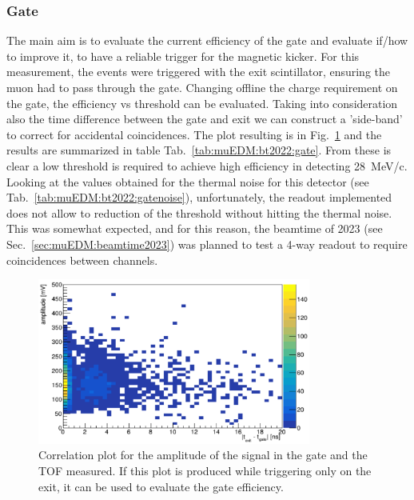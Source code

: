 \begin{refsection}
        \subsubsection{Gate}
            The main aim is to evaluate the current efficiency of the gate and evaluate if/how to improve it, to have a reliable trigger for the magnetic kicker.
            For this measurement, the events were triggered with the exit scintillator, ensuring the muon had to pass through the gate.
            Changing offline the charge requirement on the gate, the efficiency vs threshold can be evaluated.
            Taking into consideration also the time difference between the gate and exit we can construct a 'side-band' to correct for accidental coincidences.
            The plot resulting is in Fig.~\ref{fig:muEDM:bt20212gate} and the results are summarized in table Tab.~\ref{tab:muEDM:bt2022:gate}.
            From these is clear a low threshold is required to achieve high efficiency in detecting \SI{28}{MeV/c}.
            Looking at the values obtained for the thermal noise for this detector (see Tab.~\ref{tab:muEDM:bt2022:gatenoise}), unfortunately, the readout implemented does not allow to reduction of the threshold without hitting the thermal noise.
            This was somewhat expected, and for this reason, the beamtime of 2023 (see Sec.~\ref{sec:muEDM:beamtime2023}) was planned to test a 4-way readout to require coincidences between channels.\\

            \begin{figure}
                \centering
                \includegraphics[width = 0.8\textwidth]{Figures/muEDM_Nov2022/gate_eff-time.png}
                \caption[muEDM 2022: gate efficiency]{Correlation plot for the amplitude of the signal in the gate and the TOF measured. If this plot is produced while triggering only on the exit, it can be used to evaluate the gate efficiency.}
                \label{fig:muEDM:bt20212gate}
            \end{figure}
            

\end{refsection}
